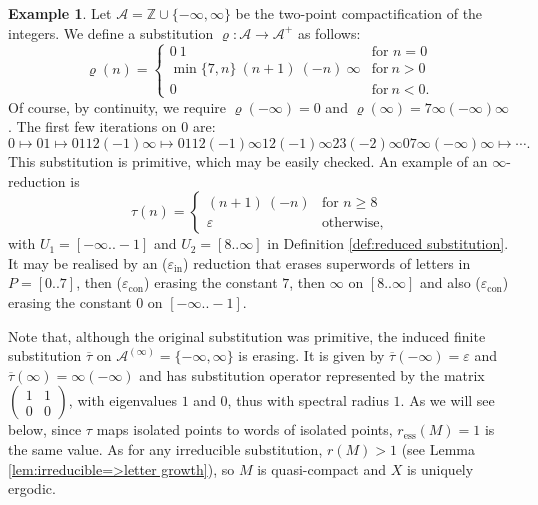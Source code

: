 \documentclass[11pt]{amsart}
\numberwithin{equation}{section}
\theoremstyle{plain}
\theoremstyle{definition}
\newtheorem{example}[theorem]{Example}
\newcommand{\Z}{{\mathbb Z}}
\newcommand{\mc}{\mathcal}
\newcommand{\A}{\mc A}
\newcommand{\sub}{\varrho}
\begin{document}
\begin{example}
Let \(\A = \Z \cup \{-\infty,\infty\}\) be the two-point compactification of the integers. We define a substitution \(\sub \colon \A \to \A^+\) as follows:
\[
\sub(n) = 
\begin{cases}
0 \ 1                               & \text{for } n=0 \\
\min\{7,n\} \ (n+1) \ (-n) \ \infty & \text{for} \ n > 0 \\
0                                   & \text{for} \ n < 0 .
\end{cases}
\]
Of course, by continuity, we require \(\sub(-\infty) = 0\) and \(\sub(\infty) = 7 \infty (-\infty) \infty\). The first few iterations on \(0\) are:
\[
0 \mapsto 01 \mapsto 01 12(-1)\infty \mapsto 01 12(-1)\infty 12(-1)\infty 23(-2)\infty 0 7 \infty(-\infty) \infty \mapsto \cdots .
\]
This substitution is primitive, which may be easily checked. An example of an \(\infty\)-reduction is
\[
\tau(n) =
\begin{cases}
(n+1) \ (-n)  & \text{for } n \geq 8\\
\varepsilon & \text{otherwise} ,
\end{cases}
\]
with \(U_1 = [-\infty..-1]\) and \(U_2 = [8..\infty]\) in Definition \ref{def:reduced substitution}. It may be realised by an (\(\varepsilon_\mathrm{in}\)) reduction that erases superwords of letters in \(P = [0..7]\), then (\(\varepsilon_\mathrm{con}\)) erasing the constant \(7\), then \(\infty\) on \([8..\infty]\) and also (\(\varepsilon_\mathrm{con}\)) erasing the constant \(0\) on \([-\infty..-1]\).

Note that, although the original substitution was primitive, the induced finite substitution \(\overline{\tau}\) on \(\A^{(\infty)} = \{-\infty,\infty\}\) is erasing. It is given by \(\overline{\tau}(-\infty) = \varepsilon\) and \(\overline{\tau}(\infty) = \infty (-\infty)\) and has substitution operator represented by the matrix
\(\begin{pmatrix}
1 & 1 \\
0 & 0
\end{pmatrix}\), with eigenvalues \(1\) and \(0\), thus with spectral radius \(1\). As we will see below, since \(\tau\) maps isolated points to words of isolated points, \(r_\mathrm{ess}(M) = 1\) is the same value. As for any irreducible substitution, \(r(M) > 1\) (see Lemma \ref{lem:irreducible=>letter growth}), so \(M\) is quasi-compact and \(X\) is uniquely ergodic.
\end{example}
\end{document}

